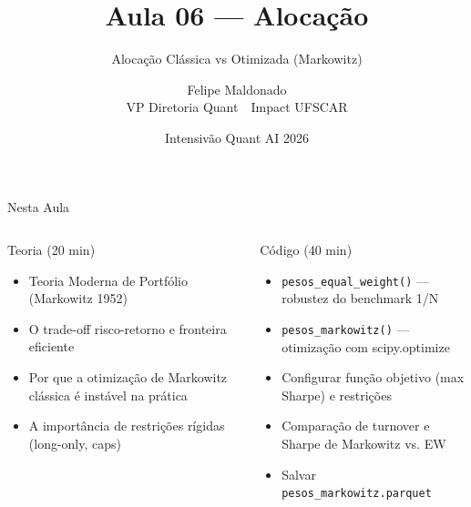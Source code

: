 \documentclass[aspectratio=169,12pt]{beamer}
\author{Felipe Maldonado\\{\scriptsize VP Diretoria Quant~\textbullet{}~Impact UFSCAR}}
\date{Intensivão Quant AI 2026}
\title{Aula 06 --- Alocação}
\subtitle{Alocação Clássica vs Otimizada (Markowitz)}
\begin{document}
\begin{frame}[plain]
\titlepage
\end{frame}

\begin{frame}[fragile]{Nesta Aula}
\begin{columns}[T]
\begin{block}{Teoria (20 min)}
\begin{itemize}
  \item Teoria Moderna de Portfólio (Markowitz 1952)
  \item O trade-off risco-retorno e fronteira eficiente
  \item Por que a otimização de Markowitz clássica é instável na prática
  \item A importância de restrições rígidas (long-only, caps)
\end{itemize}
\end{block}
\begin{block}{Código (40 min)}
\begin{itemize}
  \item \texttt{pesos\_equal\_weight()} — robustez do benchmark 1/N
  \item \texttt{pesos\_markowitz()} — otimização com scipy.optimize
  \item Configurar função objetivo (max Sharpe) e restrições
  \item Comparação de turnover e Sharpe de Markowitz vs. EW
  \item Salvar \texttt{pesos\_markowitz.parquet}
\end{itemize}
\end{block}
\end{columns}
\end{frame}
\end{document}
